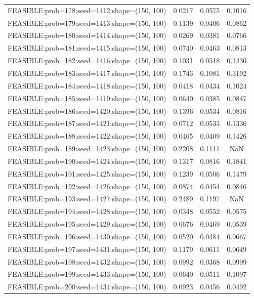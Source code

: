 \begin{longtable}{lccc}
FEASIBLE:prob=178:seed=1412:shape=(150, 100) & 0.0217 & 0.0575 & 0.1016 \\
FEASIBLE:prob=179:seed=1413:shape=(150, 100) & 0.1139 & 0.0406 & 0.0862 \\
FEASIBLE:prob=180:seed=1414:shape=(150, 100) & 0.0269 & 0.0381 & 0.0766 \\
FEASIBLE:prob=181:seed=1415:shape=(150, 100) & 0.0740 & 0.0463 & 0.0813 \\
FEASIBLE:prob=182:seed=1416:shape=(150, 100) & 0.1031 & 0.0518 & 0.1430 \\
FEASIBLE:prob=183:seed=1417:shape=(150, 100) & 0.1743 & 0.1081 & 0.3192 \\
FEASIBLE:prob=184:seed=1418:shape=(150, 100) & 0.0418 & 0.0434 & 0.1024 \\
FEASIBLE:prob=185:seed=1419:shape=(150, 100) & 0.0640 & 0.0385 & 0.0847 \\
FEASIBLE:prob=186:seed=1420:shape=(150, 100) & 0.1396 & 0.0534 & 0.0816 \\
FEASIBLE:prob=187:seed=1421:shape=(150, 100) & 0.0712 & 0.0533 & 0.1336 \\
FEASIBLE:prob=188:seed=1422:shape=(150, 100) & 0.0465 & 0.0409 & 0.1426 \\
FEASIBLE:prob=189:seed=1423:shape=(150, 100) & 0.2208 & 0.1111 &    NaN \\
FEASIBLE:prob=190:seed=1424:shape=(150, 100) & 0.1317 & 0.0816 & 0.1841 \\
FEASIBLE:prob=191:seed=1425:shape=(150, 100) & 0.1239 & 0.0506 & 0.1479 \\
FEASIBLE:prob=192:seed=1426:shape=(150, 100) & 0.0874 & 0.0454 & 0.0846 \\
FEASIBLE:prob=193:seed=1427:shape=(150, 100) & 0.2489 & 0.1197 &    NaN \\
FEASIBLE:prob=194:seed=1428:shape=(150, 100) & 0.0348 & 0.0552 & 0.0575 \\
FEASIBLE:prob=195:seed=1429:shape=(150, 100) & 0.0676 & 0.0469 & 0.0539 \\
FEASIBLE:prob=196:seed=1430:shape=(150, 100) & 0.0520 & 0.0484 & 0.0667 \\
FEASIBLE:prob=197:seed=1431:shape=(150, 100) & 0.1179 & 0.0611 & 0.0649 \\
FEASIBLE:prob=198:seed=1432:shape=(150, 100) & 0.0992 & 0.0368 & 0.0999 \\
FEASIBLE:prob=199:seed=1433:shape=(150, 100) & 0.0640 & 0.0511 & 0.1097 \\
FEASIBLE:prob=200:seed=1434:shape=(150, 100) & 0.0923 & 0.0456 & 0.0492 \\

\end{longtable}
